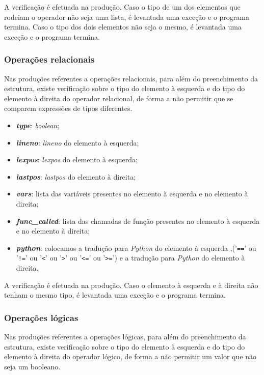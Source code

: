 \documentclass[11pt,a4paper]{report}
\begin{document}
A verificação é efetuada na produção. Caso o tipo de um dos elementos que rodeiam o operador não seja uma lista, é levantada uma exceção e o programa termina. Caso o tipo dos dois elementos não seja o mesmo, é levantada uma exceção e o programa termina.

\subsubsection{Operações relacionais}

Nas produções referentes a operações relacionais, para além do preenchimento da estrutura, existe verificação sobre o tipo do elemento à esquerda e do tipo do elemento à direita do operador relacional, de forma a não permitir que se comparem expressões de tipos diferentes.

\begin{itemize}
  \item \textit{\textbf{type}}: \textit{boolean};
  \item \textit{\textbf{lineno}}: \textit{lineno} do elemento à esquerda;
  \item \textit{\textbf{lexpos}}: \textit{lexpos} do elemento à esquerda;
  \item \textit{\textbf{lastpos}}: \textit{lastpos} do elemento à direita;
  \item \textit{\textbf{vars}}: lista das variáveis presentes no elemento à esquerda e no elemento à direita;
  \item \textit{\textbf{func\_called}}: lista das chamadas de função presentes no elemento à esquerda e no elemento à direita;
  \item \textit{\textbf{python}}: colocamos a tradução para \textit{Python} do elemento à esquerda ,('\texttt{==}' ou '\texttt{!=}' ou '\texttt{<}' ou '\texttt{>}' ou '\texttt{<=}' ou '\texttt{>=}') e a tradução para \textit{Python} do elemento à direita.
\end{itemize}

A verificação é efetuada na produção. Caso o elemento à esquerda e à direita não tenham o mesmo tipo, é levantada uma exceção e o programa termina.

\subsubsection{Operações lógicas}

Nas produções referentes a operações lógicas, para além do preenchimento da estrutura, existe verificação sobre o tipo do elemento à esquerda e do tipo do elemento à direita do operador lógico, de forma a não permitir um valor que não seja um booleano.
\end{document}
